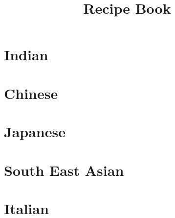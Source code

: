 \documentclass[a4paper,12pt]{book}
\title{Recipe Book}
\author{}
\date{}
\newcommand{\invisiblechapter}[1]{%
  \refstepcounter{chapter}%
  \addcontentsline{toc}{chapter}{\protect\numberline{\thechapter}#1}%
  \chaptermark{#1}}
\begin{document}
\maketitle
\tableofcontents
\chapter{Indian}








\chapter{Chinese}







\chapter{Japanese}



\chapter{South East Asian}







\chapter{Italian}








\end{document}
